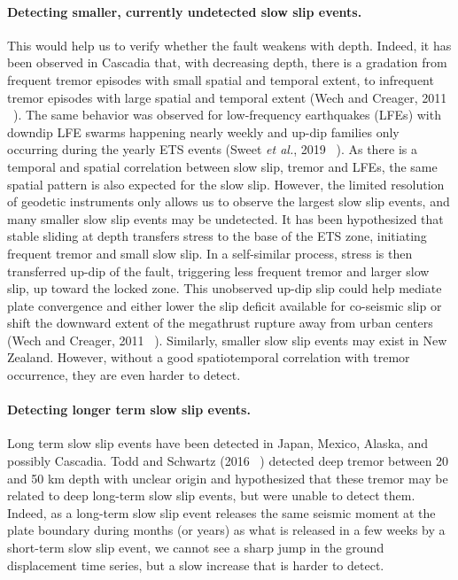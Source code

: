\documentclass[letterpaper, 12pt]{article}
\begin{document}
\paragraph{Detecting smaller, currently undetected slow slip events.} This would help us to verify whether the fault weakens with depth. Indeed, it has been observed in Cascadia that, with decreasing depth, there is a gradation from frequent tremor episodes with small spatial and temporal extent, to infrequent tremor episodes with large spatial and temporal extent (Wech and Creager, 2011 ~\cite{WEC_2011}). The same behavior was observed for low-frequency earthquakes (LFEs) with downdip LFE swarms happening nearly weekly and up-dip families only occurring during the yearly ETS events (Sweet \textit{et al.}, 2019 ~\cite{SWE_2019}). As there is a temporal and spatial correlation between slow slip, tremor and LFEs, the same spatial pattern is also expected for the slow slip. However, the limited resolution of geodetic instruments only allows us to observe the largest slow slip events, and many smaller slow slip events may be undetected. It has been hypothesized that stable sliding at depth transfers stress to the base of the ETS zone, initiating frequent tremor and small slow slip. In a self-similar process, stress is then transferred up-dip of the fault, triggering less frequent tremor and larger slow slip, up toward the locked zone. This unobserved up-dip slip could help mediate plate convergence and either lower the slip deficit available for co-seismic slip or shift the downward extent of the megathrust rupture away from urban centers (Wech and Creager, 2011 ~\cite{WEC_2011}). Similarly, smaller slow slip events may exist in New Zealand. However, without a good spatiotemporal correlation with tremor occurrence, they are even harder to detect.

\paragraph{Detecting longer term slow slip events.} Long term slow slip events have been detected in Japan, Mexico, Alaska, and possibly Cascadia. Todd and Schwartz (2016 ~\cite{TOD_2016}) detected deep tremor between 20 and 50 km depth with unclear origin and hypothesized that these tremor may be related to deep long-term slow slip events, but were unable to detect them. Indeed, as a long-term slow slip event releases the same seismic moment at the plate boundary during months (or years) as what is released in a few weeks by a short-term slow slip event, we cannot see a sharp jump in the ground displacement time series, but a slow increase that is harder to detect. 
\end{document}
